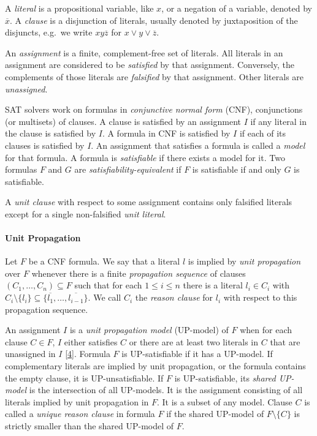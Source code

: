 \documentclass[
]{report}
\begin{document}
A \emph{literal} is a propositional variable, like \(x\), or a negation
of a variable, denoted by \(\overline{x}\). A \emph{clause} is a
disjunction of literals, usually denoted by juxtaposition of the
disjuncts, e.g.~we write \(xy\overline{z}\) for
\(x \lor y \lor \overline{z}\).

An \emph{assignment} is a finite, complement-free set of literals. All
literals in an assignment are considered to be \emph{satisfied} by that
assignment. Conversely, the complements of those literals are
\emph{falsified} by that assignment. Other literals are
\emph{unassigned}.

SAT solvers work on formulas in \emph{conjunctive normal form} (CNF),
conjunctions (or multisets) of clauses. A clause is satisfied by an
assignment \(I\) if any literal in the clause is satisfied by \(I\). A
formula in CNF is satisfied by \(I\) if each of its clauses is satisfied
by \(I\). An assignment that satisfies a formula is called a
\emph{model} for that formula. A formula is \emph{satisfiable} if there
exists a model for it. Two formulas \(F\) and \(G\) are
\emph{satisfiability-equivalent} if \(F\) is satisfiable if and only
\(G\) is satisfiable.

A \emph{unit clause} with respect to some assignment contains only
falsified literals except for a single non-falsified \emph{unit
literal}.

\paragraph{Unit Propagation}

Let \(F\) be a CNF formula. We say that a literal \(l\) is implied by
\emph{unit propagation} over \(F\) whenever there is a finite
\emph{propagation sequence} of clauses \((C_1,\dots,C_n) \subseteq F\)
such that for each \(1 \leq i \leq n\) there is a literal
\(l_i \in C_i\) with
\(C_i \setminus \{l_i\} \subseteq \{\overline{l_1},\dots,\overline{l_{i-1}}\}\).
We call \(C_i\) the \emph{reason clause} for \(l_i\) with respect to
this propagation sequence.

An assignment \(I\) is a \emph{unit propagation model} (UP-model) of
\(F\) when for each clause \(C \in F\), \(I\) either satisfies \(C\) or
there are at least two literals in \(C\) that are unassigned in \(I\)
{[}\protect\hyperlink{ref-DBLP:confux2fsatux2fRebola-PardoB18}{4}{]}.
Formula \(F\) is UP-satisfiable if it has a UP-model. If complementary
literals are implied by unit propagation, or the formula contains the
empty clause, it is UP-unsatisfiable. If \(F\) is UP-satisfiable, its
\emph{shared UP-model} is the intersection of all UP-models. It is the
assignment consisting of all literals implied by unit propagation in
\(F\). It is a subset of any model. Clause \(C\) is called a
\emph{unique reason clause} in formula \(F\) if the shared UP-model of
\(F \setminus \{C\}\) is strictly smaller than the shared UP-model of
\(F\).
\end{document}
